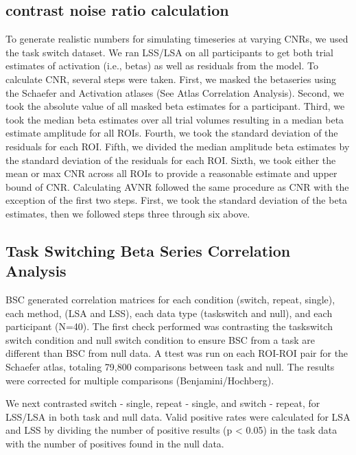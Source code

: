 \documentclass[10pt,letterpaper]{article}
\begin{document}
\subsection*{contrast noise ratio calculation}
To generate realistic numbers for simulating timeseries at varying CNRs,
we used the task switch dataset.
We ran LSS/LSA on all participants to get both trial estimates of activation (i.e., betas)
as well as residuals from the model.
To calculate CNR, several steps were taken.
First, we masked the betaseries using the Schaefer and Activation atlases (See Atlas Correlation Analysis).
Second, we took the absolute value of all masked beta estimates for a participant.
Third, we took the median beta estimates over all trial volumes resulting
in a median beta estimate amplitude for all ROIs.
Fourth, we took the standard deviation of the residuals for each ROI.
Fifth, we divided the median amplitude beta estimates by the standard deviation of the residuals
for each ROI.
Sixth, we took either the mean or max CNR across all ROIs to provide a reasonable estimate
and upper bound of CNR.
Calculating AVNR followed the same procedure as CNR with the exception of the first two steps.
First, we took the standard deviation of the beta estimates, then we followed steps three through six above.

\subsection*{Task Switching Beta Series Correlation Analysis}

BSC generated correlation matrices for each condition (switch, repeat, single),
each method, (LSA and LSS), each data type (taskswitch and null), and each participant (N=40).
The first check performed was contrasting the taskswitch switch condition and null switch condition
to ensure BSC from a task are different than BSC from null data.
A ttest was run on each ROI-ROI pair for the Schaefer atlas, totaling 79,800 comparisons
between task and null.
The results were corrected for multiple comparisons (Benjamini/Hochberg).


We next contrasted switch - single, repeat - single, and switch - repeat, for LSS/LSA in both
task and null data.
Valid positive rates were calculated for LSA and LSS by dividing the number of positive results (p < 0.05)
in the task data with the number of positives found in the null data.


\end{document}
